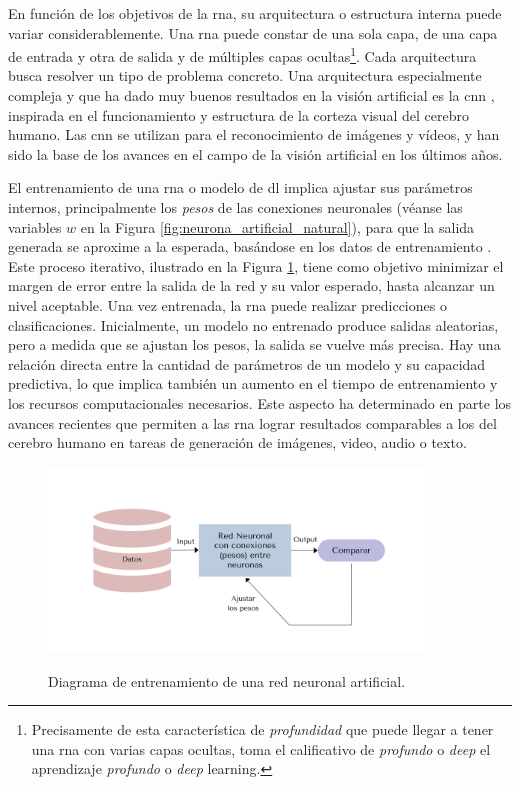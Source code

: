 En función de los objetivos de la \gls{rna}, su arquitectura o estructura interna puede variar considerablemente. Una \gls{rna} puede constar de una sola capa, de una capa de entrada y otra de salida y de múltiples capas ocultas\footnote{Precisamente de esta característica de \emph{profundidad} que puede llegar a tener una \gls{rna} con varias capas ocultas, toma el calificativo de \emph{profundo} o \emph{deep} el aprendizaje \emph{profundo} o \emph{deep} learning.}. Cada arquitectura busca resolver un tipo de problema concreto. Una arquitectura especialmente compleja y que ha dado muy buenos resultados en la visión artificial es la \gls{cnn} \citep{osheaIntroductionConvolutionalNeural2015}, inspirada en el funcionamiento y estructura de la corteza visual del cerebro humano. Las \gls{cnn} se utilizan para el reconocimiento de imágenes y vídeos, y han sido la base de los avances en el campo de la visión artificial en los últimos años.

El entrenamiento de una \gls{rna} o modelo de \gls{dl} implica ajustar sus parámetros internos, principalmente los \emph{pesos} de las conexiones neuronales (véanse las variables $w$ en la Figura \ref{fig:neurona_artificial_natural}), para que la salida generada se aproxime a la esperada, basándose en los datos de entrenamiento \citep{NurArtificialNeural2014}. Este proceso iterativo, ilustrado en la Figura \ref{fig:ann_training}, tiene como objetivo minimizar el margen de error entre la salida de la red y su valor esperado, hasta alcanzar un nivel aceptable. Una vez entrenada, la \gls{rna} puede realizar predicciones o clasificaciones. Inicialmente, un modelo no entrenado produce salidas aleatorias, pero a medida que se ajustan los pesos, la salida se vuelve más precisa. Hay una relación directa entre la cantidad de parámetros de un modelo y su capacidad predictiva, lo que implica también un aumento en el tiempo de entrenamiento y los recursos computacionales necesarios. Este aspecto ha determinado en parte los avances recientes que permiten a las \gls{rna} lograr resultados comparables a los del cerebro humano en tareas de generación de imágenes, video, audio o texto.

\begin{figure}[H]
    \caption[Diagrama de entrenamiento de una red neuronal artificial]{Diagrama de entrenamiento de una red neuronal artificial.}
    \centering
    \includegraphics[width=0.9\textwidth]{./figuras/ann_training.png}
    \source{\propio}
    \label{fig:ann_training}
\end{figure}

